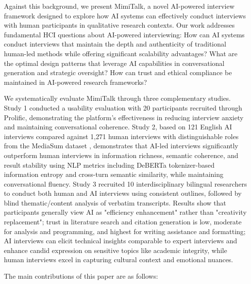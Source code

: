 \documentclass[sigchi,nonacm,manuscript]{acmart}
\begin{document}
Against this background, we present MimiTalk, a novel AI-powered interview framework designed to explore how AI systems can effectively conduct interviews with human participants in qualitative research contexts. Our work addresses fundamental HCI questions about AI-powered interviewing: How can AI systems conduct interviews that maintain the depth and authenticity of traditional human-led methods while offering significant scalability advantages? What are the optimal design patterns that leverage AI capabilities in conversational generation and strategic oversight? How can trust and ethical compliance be maintained in AI-powered research frameworks?

We systematically evaluate MimiTalk through three complementary studies. Study 1 conducted a usability evaluation with 20 participants recruited through Prolific, demonstrating the platform's effectiveness in reducing interview anxiety and maintaining conversational coherence. Study 2, based on 121 English AI interviews compared against 1,271 human interviews with distinguishable roles from the MediaSum dataset \citep{zhuMediaSumLargescaleMedia2021}, demonstrates that AI-led interviews significantly outperform human interviews in information richness, semantic coherence, and result stability using NLP metrics including DeBERTa \citep{heDeBERTaDecodingenhancedBERT2020} tokenizer-based information entropy and cross-turn semantic similarity, while maintaining conversational fluency. Study 3 recruited 10 interdisciplinary bilingual researchers to conduct both human and AI interviews using consistent outlines, followed by blind thematic/content analysis of verbatim transcripts. Results show that participants generally view AI as "efficiency enhancement" rather than "creativity replacement"; trust in literature search and citation generation is low, moderate for analysis and programming, and highest for writing assistance and formatting; AI interviews can elicit technical insights comparable to expert interviews and enhance candid expression on sensitive topics like academic integrity, while human interviews excel in capturing cultural context and emotional nuances.

The main contributions of this paper are as follows:
\end{document}
